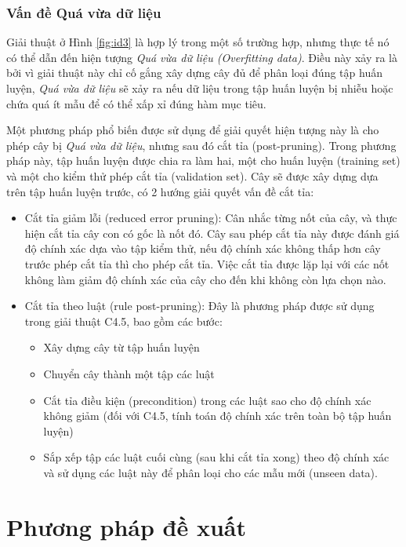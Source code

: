 \documentclass[12pt]{extarticle}
\begin{document}
			\subsubsection*{Vấn đề Quá vừa dữ liệu}
				\par Giải thuật ở Hình \ref{fig:id3} là hợp lý trong một số trường hợp, nhưng thực tế nó có thể dẫn đến hiện tượng \textit{Quá vừa dữ liệu (Overfitting data)}. Điều này xảy ra là bởi vì giải thuật này chỉ cố gắng xây dựng cây đủ để phân loại đúng tập huấn luyện, \textit{Quá vừa dữ liệu} sẽ xảy ra nếu dữ liệu trong tập huấn luyện bị nhiễu hoặc chứa quá ít mẫu để có thể xấp xỉ đúng hàm mục tiêu.
				\par Một phương pháp phổ biến được sử dụng để giải quyết hiện tượng này là cho phép cây bị \textit{Quá vừa dữ liệu}, nhưng sau đó cắt tỉa (post-pruning). Trong phương pháp này, tập huấn luyện được chia ra làm hai, một cho huấn luyện (training set) và một cho kiểm thử phép cắt tỉa (validation set). Cây sẽ được xây dựng dựa trên tập huấn luyện trước, có 2 hướng giải quyết vấn đề cắt tỉa:
				\begin{itemize}
				\item{Cắt tỉa giảm lỗi (reduced error pruning): Cân nhắc từng nốt của cây, và thực hiện cắt tỉa cây con có gốc là nốt đó. Cây sau phép cắt tỉa này được đánh giá độ chính xác dựa vào tập kiểm thử, nếu độ chính xác không thấp hơn cây trước phép cắt tỉa thì cho phép cắt tỉa. Việc cắt tỉa được lặp lại với các nốt không làm giảm độ chính xác của cây cho đến khi không còn lựa chọn nào.}
				\item{Cắt tỉa theo luật (rule post-pruning): Đây là phương pháp được sử dụng trong giải thuật C4.5, bao gồm các bước:
					\begin{itemize}
						\item{Xây dựng cây từ tập huấn luyện}
						\item{Chuyển cây thành một tập các luật}
						\item{Cắt tỉa điều kiện (precondition) trong các luật sao cho độ chính xác không giảm (đối với C4.5, tính toán độ chính xác trên toàn bộ tập huấn luyện)}
						\item{Sắp xếp tập các luật cuối cùng (sau khi cắt tỉa xong) theo độ chính xác và sử dụng các luật này để phân loại cho các mẫu mới (unseen data).}
					\end{itemize}}				
				\end{itemize}

	\section{Phương pháp đề xuất}
\end{document}
